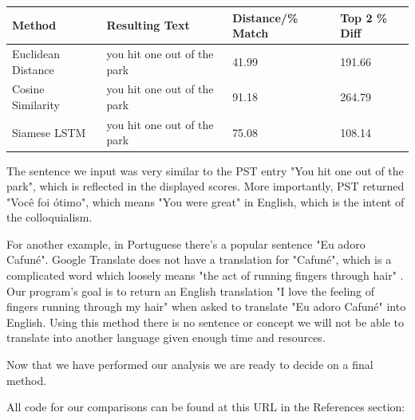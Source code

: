 \documentclass[runningheads]{llncs}
\begin{document}
\vspace{10 mm}
	\begin{minipage}{\linewidth}
			\begin{tabular}{| l | l | l | l |}
			  \hline			
			  Method & Resulting Text & Distance/\% Match & Top 2 \% Diff \\
			  \hline			
			  Euclidean Distance & you hit one out of the park & 41.99 & 191.66 \\
			  \hline			
			  Cosine Similarity & you hit one out of the park & 91.18 & 264.79 \\
			  \hline  
			  Siamese LSTM & you hit one out of the park & 75.08 & 108.14 \\
			  \hline
			\end{tabular}
	\end{minipage}
	\afterpage{\clearpage}
\vspace{10 mm}

	The sentence we input was very similar to the PST entry "You hit one out of the park", which is reflected in the displayed scores. More importantly, PST returned "Você foi ótimo", which means "You were great" in English, which is the intent of the colloquialism. 

	For another example, in Portuguese there's a popular sentence "Eu adoro Cafuné". Google Translate does not have a translation for "Cafuné", which is a complicated word which loosely means "the act of running fingers through hair" . Our program's goal is to return an English translation "I love the feeling of fingers running through my hair" when asked to translate "Eu adoro Cafuné" into English. Using this method there is no sentence or concept we will not be able to translate into another language given enough time and resources.

	Now that we have performed our analysis we are ready to decide on a final method.

	All code for our comparisons can be found at this URL in the References section: ~\cite{ref_url20}
	
\end{document}
